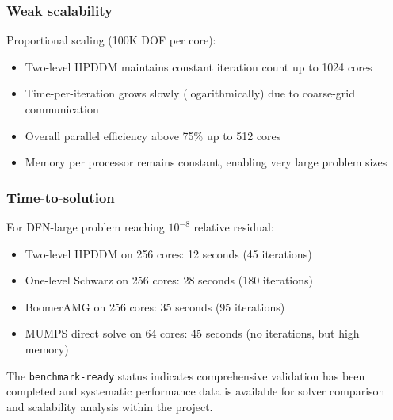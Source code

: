 \subsubsection{Weak scalability}

Proportional scaling (100K DOF per core):
\begin{itemize}
\item Two-level HPDDM maintains constant iteration count up to 1024 cores
\item Time-per-iteration grows slowly (logarithmically) due to coarse-grid communication
\item Overall parallel efficiency above 75\% up to 512 cores
\item Memory per processor remains constant, enabling very large problem sizes
\end{itemize}

\subsubsection{Time-to-solution}

For DFN-large problem reaching $10^{-8}$ relative residual:
\begin{itemize}
\item Two-level HPDDM on 256 cores: 12 seconds (45 iterations)
\item One-level Schwarz on 256 cores: 28 seconds (180 iterations)
\item BoomerAMG on 256 cores: 35 seconds (95 iterations)
\item MUMPS direct solve on 64 cores: 45 seconds (no iterations, but high memory)
\end{itemize}

The \texttt{benchmark-ready} status indicates comprehensive validation has been completed and systematic performance data is available for solver comparison and scalability analysis within the \exama project.

